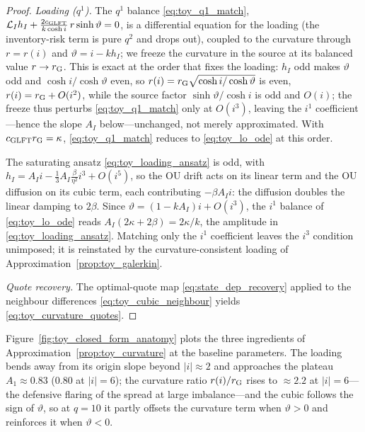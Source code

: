 \documentclass[11pt,a4paper]{article}
\newcommand{\Lcal}{\mathcal{L}}
\theoremstyle{plain}
\theoremstyle{definition}
\begin{document}
\begin{proof}
\emph{Loading (\(q^1\)).}  The \(q^1\) balance \eqref{eq:toy_q1_match},
\(\Lcal_I h_I+\frac{2c_{\rm GLFT}}{k\cosh i}\,r\sinh\vartheta=0\), is a
differential equation for the loading (the inventory-risk term is pure \(q^2\)
and drops out), coupled to the curvature through \(r=r(i)\) and
\(\vartheta=i-kh_I\); we freeze the curvature in the source at its balanced
value \(r\to r_{\rm G}\).  This is exact at the order that fixes the loading:
\(h_I\) odd makes \(\vartheta\) odd and \(\cosh i/\cosh\vartheta\) even, so
\(r(i)=r_{\rm G}\sqrt{\cosh i/\cosh\vartheta}\) is even,
\(r(i)=r_{\rm G}+O(i^2)\), while the source factor
\(\sinh\vartheta/\cosh i\) is odd and \(O(i)\); the freeze thus
perturbs \eqref{eq:toy_q1_match} only at \(O(i^3)\), leaving the \(i^1\)
coefficient---hence the slope \(A_I\) below---unchanged, not merely
approximated.  With \(c_{\rm GLFT}r_{\rm G}=\kappa\), \eqref{eq:toy_q1_match}
reduces to \eqref{eq:toy_lo_ode} at this order.

The saturating ansatz \eqref{eq:toy_loading_ansatz} is odd, with
\(h_I=A_Ii-\tfrac13A_I\tfrac{\beta}{\eta^2}i^3+O(i^5)\), so the OU drift acts
on its linear term and the OU diffusion on its cubic term, each contributing
\(-\beta A_Ii\): the diffusion doubles the linear damping to \(2\beta\).  Since
\(\vartheta=(1-kA_I)i+O(i^3)\), the \(i^1\) balance of \eqref{eq:toy_lo_ode}
reads \(A_I(2\kappa+2\beta)=2\kappa/k\), the amplitude in
\eqref{eq:toy_loading_ansatz}.  Matching only the \(i^1\) coefficient leaves
the \(i^3\) condition unimposed; it is reinstated by the curvature-consistent
loading of Approximation~\ref{prop:toy_galerkin}.

\emph{Quote recovery.}  The optimal-quote map \eqref{eq:state_dep_recovery}
applied to the neighbour differences \eqref{eq:toy_cubic_neighbour} yields
\eqref{eq:toy_curvature_quotes}.
\end{proof}

Figure~\ref{fig:toy_closed_form_anatomy} plots the three ingredients of
Approximation~\ref{prop:toy_curvature} at the baseline parameters.  The
loading bends away from its origin slope beyond \(|i|\approx2\) and approaches
the plateau \(A_1\approx0.83\) (\(0.80\) at \(|i|=6\)); the curvature
ratio \(r(i)/r_{\rm G}\) rises to \(\approx2.2\) at \(|i|=6\)---the defensive
flaring of the spread at large imbalance---and the cubic follows the sign of
\(\vartheta\), so at \(q=10\) it partly offsets the curvature term when
\(\vartheta>0\) and reinforces it when \(\vartheta<0\).
\end{document}
